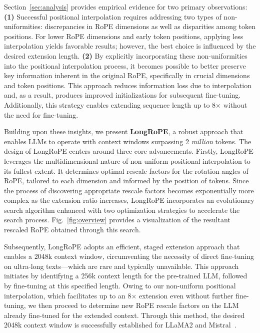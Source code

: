 Section~\ref{sec:analysis} provides empirical evidence for two primary observations: \textbf{(1)} Successful positional interpolation requires addressing two types of non-uniformities: discrepancies in RoPE dimensions as well as disparities among token positions. For lower RoPE dimensions and early token positions, applying less interpolation yields favorable results; however, the best choice is influenced by the desired extension length. \textbf{(2)} By explicitly incorporating these non-uniformities into the positional interpolation process, it becomes possible to better preserve key information inherent in the original RoPE, specifically in crucial dimensions and token positions. This approach reduces information loss due to interpolation and, as a result, produces improved initializations for subsequent fine-tuning. Additionally, this strategy enables extending sequence length up to 8$\times$ without the need for fine-tuning.

Building upon these insights, we present \textbf{LongRoPE}, a robust approach that enables LLMs to operate with context windows surpassing 2 \emph{million} tokens. The design of LongRoPE centers around three core advancements. Firstly, {LongRoPE} leverages the multidimensional nature of non-uniform positional interpolation to its fullest extent. It determines optimal rescale factors for the rotation angles of RoPE, tailored to each dimension and informed by the position of tokens. Since the process of discovering appropriate rescale factors becomes exponentially more complex as the extension ratio increases, {LongRoPE} incorporates an evolutionary search algorithm enhanced with two optimization strategies to accelerate the search process. Fig.~\ref{fig:overview} provides a visualization of the resultant rescaled RoPE obtained through this search.

Subsequently, {LongRoPE} adopts an efficient, staged extension approach that enables a 2048k context window, circumventing the necessity of direct fine-tuning on ultra-long texts—which are rare and typically unavailable. This approach initiates by identifying a 256k context length for the pre-trained LLM, followed by fine-tuning at this specified length. Owing to our non-uniform positional interpolation, which facilitates up to an 8$\times$ extension even without further fine-tuning, we then proceed to determine new RoPE rescale factors on the LLM already fine-tuned for the extended context. Through this method, the desired 2048k context window is successfully established for LLaMA2 and Mistral~\cite{mistral}.

